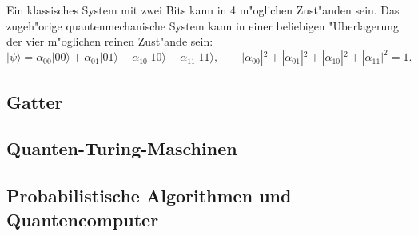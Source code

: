 Ein klassisches System mit zwei Bits kann in 4 m"oglichen Zust"anden sein.
Das zugeh"orige quantenmechanische System kann in einer beliebigen
"Uberlagerung der vier m"oglichen reinen Zust"ande sein:
\[
|\psi\rangle
=
\alpha_{00}|00\rangle
+
\alpha_{01}|01\rangle
+
\alpha_{10}|10\rangle
+
\alpha_{11}|11\rangle
,\qquad
|\alpha_{00}|^2
+
|\alpha_{01}|^2
+
|\alpha_{10}|^2
+
|\alpha_{11}|^2
=1.
\]


\subsection{Gatter}

\subsection{Quanten-Turing-Maschinen}

\subsection{Probabilistische Algorithmen und Quantencomputer}

